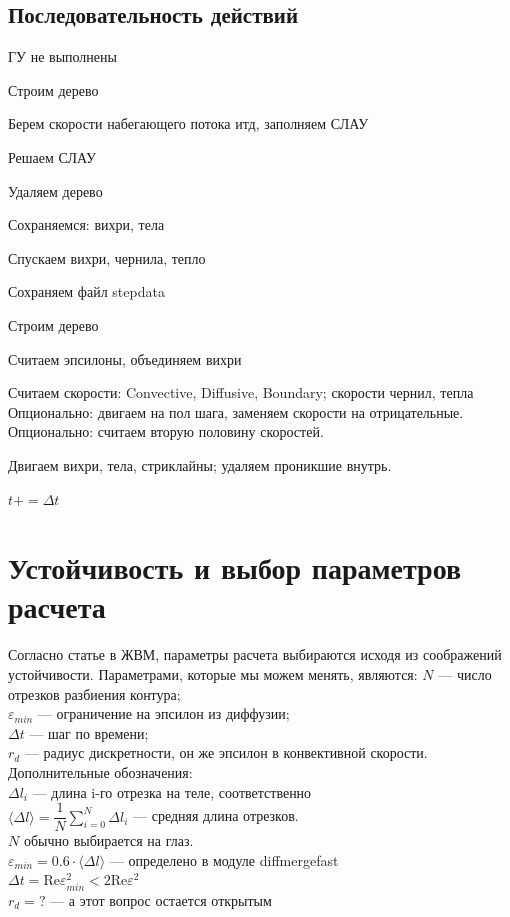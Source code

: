 \documentclass[a4paper,14pt]{extreport}
\newcommand{\Reyn}{\text{Re}}
\newenvironment{packed_enum}{
\begin{enumerate}
  \setlength{\itemsep}{1pt}
  \setlength{\parskip}{0pt}
  \setlength{\parsep}{0pt}
}{\end{enumerate}}
\begin{document}
\subsection{Последовательность действий}
\begin{packed_enum}
\item ГУ не выполнены\\
\item Строим дерево
\item Берем скорости набегающего потока итд, заполняем СЛАУ
\item Решаем СЛАУ
\item Удаляем дерево\\
\item Сохраняемся: вихри, тела
\item Спускаем вихри, чернила, тепло
\item Сохраняем файл stepdata\\
\item Строим дерево
\item Считаем эпсилоны, объединяем вихри
\item Считаем скорости: Convective, Diffusive, Boundary; скорости чернил, тепла
\subitem Опционально: двигаем на пол шага, заменяем скорости на отрицательные.
\subitem Опционально: считаем вторую половину скоростей.
\item Двигаем вихри, тела, стриклайны; удаляем проникшие внутрь.
\item $t += \Delta t$
\end{packed_enum}

\newpage
\section{Устойчивость и выбор параметров расчета}
Согласно статье в ЖВМ, параметры расчета выбираются исходя из
соображений устойчивости. Параметрами, которые мы можем менять, являются:
$N$ --- число отрезков разбиения контура;\\
$\varepsilon_{min}$ --- ограничение на эпсилон из диффузии;\\
$\Delta t$ --- шаг по времени;\\
$r_d$ --- радиус дискретности, он же эпсилон в конвективной скорости.\\

Дополнительные обозначения:\\
$\Delta l_i$ --- длина i-го отрезка на теле, соответственно \\
$\langle\Delta l \rangle=\dfrac{1}{N} \sum\limits_{i=0}^{N} \Delta l_i$ ---
средняя длина отрезков.\\
$N$ обычно выбирается на глаз.\\
$\varepsilon_{min}=0.6\cdot\langle\Delta l \rangle$ --- 
определено в модуле diffmergefast\\
$\Delta t = \Reyn \varepsilon_{min}^2 < 2 \Reyn \varepsilon^2$\\
$r_d = ?$ --- а этот вопрос остается открытым \\
\end{document}
